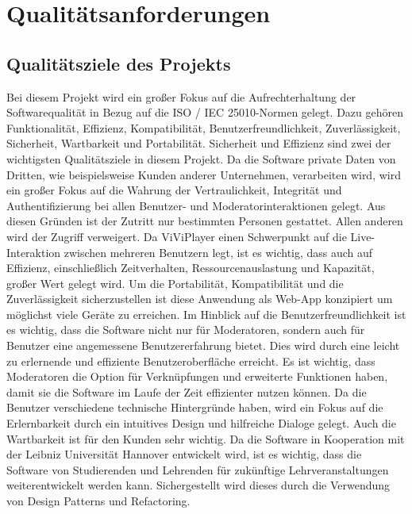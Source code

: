 \section{Qualitätsanforderungen}

	\subsection{Qualitätsziele des Projekts}
	
	Bei diesem Projekt wird ein großer Fokus auf die Aufrechterhaltung der Softwarequalität in Bezug auf die ISO / IEC 25010-Normen gelegt. Dazu gehören Funktionalität, Effizienz, Kompatibilität, Benutzerfreundlichkeit, Zuverlässigkeit, Sicherheit, Wartbarkeit und Portabilität.
    \linebreak
    Sicherheit und Effizienz sind zwei der wichtigsten Qualitätsziele in diesem Projekt. Da die Software private Daten von Dritten, wie beispielsweise Kunden anderer Unternehmen, verarbeiten wird, wird ein großer Fokus auf die Wahrung der Vertraulichkeit, Integrität und Authentifizierung bei allen Benutzer- und Moderatorinteraktionen gelegt. Aus diesen Gründen ist der Zutritt nur bestimmten Personen gestattet. Allen anderen wird der Zugriff verweigert.
    \linebreak
    Da ViViPlayer einen Schwerpunkt auf die Live-Interaktion zwischen mehreren Benutzern legt, ist es wichtig, dass auch auf Effizienz, einschließlich Zeitverhalten, Ressourcenauslastung und Kapazität, großer Wert gelegt wird. 
    \linebreak
    Um die Portabilität, Kompatibilität und die Zuverlässigkeit sicherzustellen ist diese Anwendung als Web-App konzipiert um möglichst viele Geräte zu erreichen.
    Im Hinblick auf die Benutzerfreundlichkeit ist es wichtig, dass die Software nicht nur für Moderatoren, sondern auch für Benutzer eine angemessene Benutzererfahrung bietet. Dies wird durch eine leicht zu erlernende und effiziente Benutzeroberfläche erreicht. Es ist wichtig, dass Moderatoren die Option für Verknüpfungen und erweiterte Funktionen haben, damit sie die Software im Laufe der Zeit effizienter nutzen können. Da die Benutzer verschiedene technische Hintergründe haben, wird ein Fokus auf die Erlernbarkeit durch ein intuitives Design und hilfreiche Dialoge gelegt.
    \linebreak
    Auch die Wartbarkeit ist für den Kunden sehr wichtig. Da die Software in Kooperation mit der Leibniz Universität Hannover entwickelt wird, ist es wichtig, dass die Software von Studierenden und Lehrenden für zukünftige Lehrveranstaltungen weiterentwickelt werden kann. Sichergestellt wird dieses durch die Verwendung von Design Patterns und Refactoring.
	
